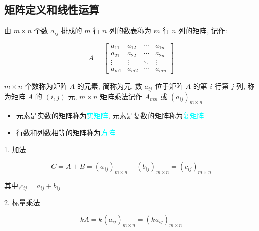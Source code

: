 \subsection{矩阵定义和线性运算}
\begin{definition}[矩阵定义]
	由 $m\times n$ 个数 $a_{ij}$ 排成的 $m$ 行 $n$ 列的数表称为 $m$ 行 $n$ 列的矩阵, 记作:
	
	$$A = \begin{bmatrix}
		a_{11} & a_{12} & \cdots & a_{1n}\\
		a_{21} & a_{22} & \cdots & a_{2n}\\
		\vdots & \vdots & \ddots & \vdots\\
		a_{m1} & a_{m2} & \cdots & a_{mn}
	\end{bmatrix}$$

	$m\times n$ 个数称为矩阵 $A$ 的元素, 简称为元, 数 $a_{ij}$ 位于矩阵 $A$ 的第 $i$ 行第 $j$ 列, 称为矩阵 $A$ 的 $(i,j)$ 元, 
	$m\times n$ 矩阵乘法记作 $A_{mn}$ 或 $(a_{ij})_{m\times n}$
	\begin{itemize}
		\item  元素是实数的矩阵称为\textcolor{cyan}{实矩阵}, 元素是复数的矩阵称为\textcolor{cyan}{复矩阵}
		\item  行数和列数相等的矩阵称为\textcolor{cyan}{方阵}
	\end{itemize}
\end{definition}

\begin{definition}[矩阵的线性运算]
	\textcolor{purpleb}{1. 加法}

	$$C=A + B=(a_{ij})_{m\times n} + (b_{ij})_{m\times n}=(c_{ij})_{m\times n}$$
	
	其中,$c_{ij}=a_{ij} + b_{ij}$

	\textcolor{purpleb}{2. 标量乘法}

	$$kA=k(a_{ij})_{m\times n}=(ka_{ij})_{m\times n}$$
\end{definition}

